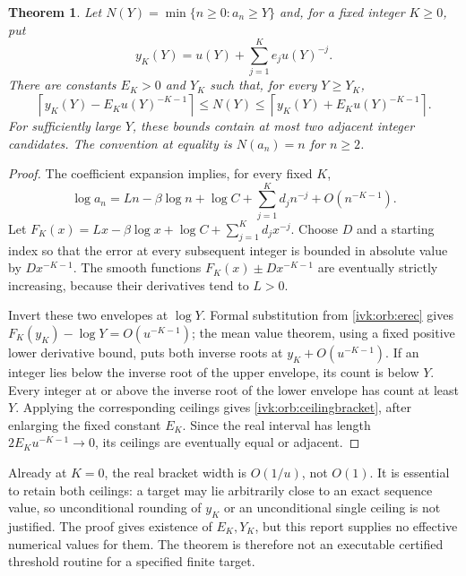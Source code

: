 \documentclass[11pt,letterpaper]{article}
\newtheorem{theorem}{Theorem}[section]
\theoremstyle{remark}\newtheorem{remark}[theorem]{Remark}
\newcommand{\ceil}[1]{\left\lceil#1\right\rceil}
\begin{document}
\begin{theorem}\label{ivk:orb:inverse}
Let $N(Y)=\min\{n\ge0:a_n\ge Y\}$ and, for a fixed integer $K\ge0$,
put
\[
y_K(Y)=u(Y)+\sum_{j=1}^{K}e_j u(Y)^{-j}.
\]
There are constants $E_K>0$ and $Y_K$ such that, for every $Y\ge Y_K$,
\begin{equation}\label{ivk:orb:ceilingbracket}
\ceil{y_K(Y)-E_Ku(Y)^{-K-1}}
\le N(Y)\le
\ceil{y_K(Y)+E_Ku(Y)^{-K-1}}.
\end{equation}
For sufficiently large $Y$, these bounds contain at most two adjacent
integer candidates. The convention at equality is $N(a_n)=n$ for
$n\ge2$.
\end{theorem}
\begin{proof}
The coefficient expansion implies, for every fixed $K$,
\[
\log a_n=Ln-\beta\log n+\log C+
\sum_{j=1}^{K}d_jn^{-j}+O(n^{-K-1}).
\]
Let $F_K(x)=Lx-\beta\log x+\log C+\sum_{j=1}^{K}d_jx^{-j}$.
Choose $D$ and a starting index so that the error at every subsequent
integer is bounded in absolute value by $Dx^{-K-1}$. The smooth
functions $F_K(x)\pm Dx^{-K-1}$ are eventually strictly increasing,
because their derivatives tend to $L>0$.

Invert these two envelopes at $\log Y$. Formal substitution from
\eqref{ivk:orb:erec} gives $F_K(y_K)-\log Y=O(u^{-K-1})$; the mean value
theorem, using a fixed positive lower derivative bound, puts both
inverse roots at $y_K+O(u^{-K-1})$. If an integer lies below the
inverse root of the upper envelope, its count is below $Y$. Every
integer at or above the inverse root of the lower envelope has count
at least $Y$. Applying the corresponding ceilings gives
\eqref{ivk:orb:ceilingbracket}, after enlarging the fixed constant $E_K$.
Since the real interval has length $2E_Ku^{-K-1}\to0$, its ceilings
are eventually equal or adjacent.
\end{proof}
Already at $K=0$, the real bracket width is $O(1/u)$, not $O(1)$.
It is essential to retain both ceilings: a target may lie arbitrarily
close to an exact sequence value, so unconditional rounding of $y_K$
or an unconditional single ceiling is not justified. The proof gives
existence of $E_K,Y_K$, but this report supplies no effective numerical
values for them. The theorem is therefore not an executable certified
threshold routine for a specified finite target.
\end{document}
